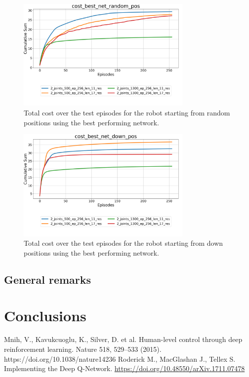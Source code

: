 \documentclass[twocolumn, a4paper]{article}
\begin{document}
\begin{figure}[H]
	\centering
	\includegraphics[width=8.5cm]{"../Figures/Summary_cost_best_net_random_pos_2J.png"}
	\caption{Total cost over the test episodes for the robot starting from
			 random positions using the best performing network.}
	\label{fig:Test_2_best_net_random_pos}
\end{figure}
\vspace{-1cm}
\begin{figure}[H]
	\centering
	\includegraphics[width=8.5cm]{"../Figures/Summary_cost_best_net_down_pos_2J.png"}
	\caption{Total cost over the test episodes for the robot starting from
			 down positions using the best performing network.}
	\label{fig:Test_2_best_net_down_pos}
\end{figure}\subsection{General remarks}
\newpage
\section{Conclusions}

\begin{thebibliography}{9}
	Mnih, V., Kavukcuoglu, K., Silver, D. et al. Human-level control through
	deep reinforcement learning. Nature 518, 529–533 (2015).
	https://doi.org/10.1038/nature14236
	Roderick M., MacGlashan J., Tellex S. Implementing the Deep Q-Network.
	\href{https://doi.org/10.48550/arXiv.1711.07478}
		 {https://doi.org/10.48550/arXiv.1711.07478}
\end{thebibliography}
\end{document}
